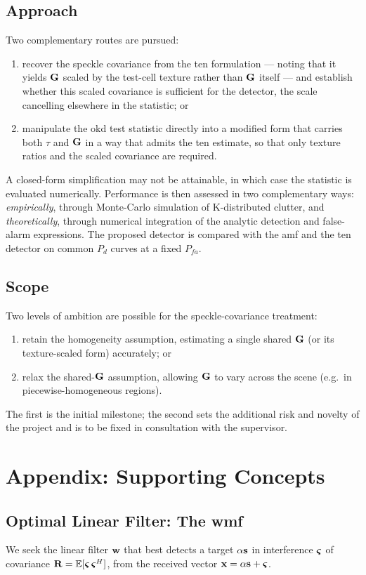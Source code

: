 \documentclass{article}
\begin{document}
\subsection{Approach}
Two complementary routes are pursued:
\begin{enumerate}
  \item recover the speckle covariance from the \gls{ten} formulation --- noting that it yields $\mathbf{G}$ scaled by the test-cell texture rather than $\mathbf{G}$ itself --- and establish whether this scaled covariance is sufficient for the detector, the scale cancelling elsewhere in the statistic; or
  \item manipulate the \gls{okd} test statistic directly into a modified form that carries both $\tau$ and $\mathbf{G}$ in a way that admits the \gls{ten} estimate, so that only texture ratios and the scaled covariance are required.
\end{enumerate}
A closed-form simplification may not be attainable, in which case the statistic is evaluated numerically. Performance is then assessed in two complementary ways: \emph{empirically}, through Monte-Carlo simulation of K-distributed clutter, and \emph{theoretically}, through numerical integration of the analytic detection and false-alarm expressions. The proposed detector is compared with the \gls{amf} and the \gls{ten} detector on common $P_d$ curves at a fixed $P_{fa}$.

\subsection{Scope}
Two levels of ambition are possible for the speckle-covariance treatment:
\begin{enumerate}
  \item retain the homogeneity assumption, estimating a single shared $\mathbf{G}$ (or its texture-scaled form) accurately; or
  \item relax the shared-$\mathbf{G}$ assumption, allowing $\mathbf{G}$ to vary across the scene (e.g.\ in piecewise-homogeneous regions).
\end{enumerate}
The first is the initial milestone; the second sets the additional risk and novelty of the project and is to be fixed in consultation with the supervisor.

\newpage
\section{Appendix: Supporting Concepts}
\subsection{Optimal Linear Filter: The \Gls{wmf}}
\label{app:wmf}
We seek the linear filter $\vb w$ that best detects a target $\alpha\vb s$ in interference $\boldsymbol{\varsigma}$ of covariance $\vb R = \mathbb{E}[\boldsymbol{\varsigma}\,\boldsymbol{\varsigma}^H]$, from the received vector $\vb x = \alpha\vb s + \boldsymbol{\varsigma}$.
\end{document}
